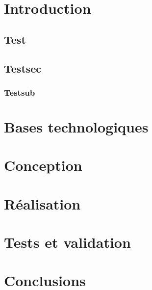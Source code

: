 \documentclass[11pt, a4paper, french, twoside, margin=2cm]{report}
\begin{document}



\tableofcontents


\chapter{Introduction}
\section{Test}
\blindtext

\blindtext

\blindtext

\blindtext

\blindtext

\blindtext
\section{Testsec}
\blindtext
\blindtext
\subsection{Testsub}
\blindtext

\chapter{Bases technologiques}
\blindtext
\chapter{Conception}
\blindtext
\chapter{Réalisation}
\blindtext
\chapter{Tests et validation}
\blindtext

\chapter{Conclusions}
\end{document}

